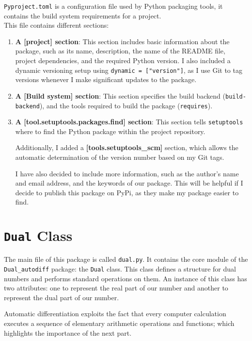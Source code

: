 \documentclass[a4paper,12pt]{article}
\begin{document}
\texttt{Pyproject.toml} is a configuration file used by Python packaging tools, it contains the build system requirements for a project.
\\
This file contains different sections:

\begin{enumerate}
    \item \textbf{A [project] section}: This section includes basic information about the package, such as its name, description, the name of the README file, project dependencies, and the required Python version. I also included a dynamic versioning setup using \texttt{dynamic = ["version"]}, as I use Git to tag versions whenever I make significant updates to the package.
    
    \item \textbf{A [Build system] section}: This section specifies the build backend (\texttt{build-backend}), and the tools required to build the package (\texttt{requires}).
    
    \item \textbf{A [tool.setuptools.packages.find] section}: This section tells \texttt{setuptools} where to find the Python package within the project repository. 

    Additionally, I added a \textbf{[tools.setuptools\_scm]} section, which allows the automatic determination of the version number based on my Git tags.
    
    I have also decided to include more information, such as the author’s name and email address, and the keywords of our package. This will be helpful if I decide to publish this package on PyPi, as they make my package easier to find.
\end{enumerate}


\section{\texttt{Dual} Class}
The main file of this package is called \texttt{dual.py}. It contains the core module of the \texttt{ Dual\_autodiff} package: the \texttt{Dual} class. This class defines a structure for dual numbers and performs standard operations on them. An instance of this class has two attributes: one to represent the real part of our number and another to represent the dual part of our number.

\vspace{10pt}

Automatic differentiation exploits the fact that every computer calculation executes a sequence of elementary arithmetic operations and functions; which highlights the importance of the next part.
\end{document}
